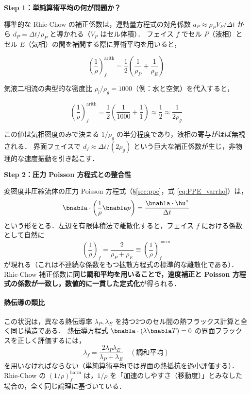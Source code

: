 \textbf{Step 1：単純算術平均の何が問題か？}

標準的な Rhie-Chow の補正係数は，運動量方程式の対角係数 $a_P \approx \rho_P V_P / \Delta t$ から $d_P = \Delta t / \rho_P$ と導かれる（$V_P$ はセル体積）．
フェイス $f$ でセル $P$（液相）とセル $E$（気相）の間を補間する際に算術平均を用いると，

\begin{equation}
 \left(\frac{1}{\rho}\right)^{\mathrm{arith}}_f = \frac{1}{2}\left(\frac{1}{\rho_P} + \frac{1}{\rho_E}\right)
\end{equation}

気液二相流の典型的な密度比 $\rho_l/\rho_g = 1000$（例：水と空気）を代入すると，

\begin{equation}
 \left(\frac{1}{\rho}\right)^{\mathrm{arith}}_f
 = \frac{1}{2}\!\left(\frac{1}{1000} + \frac{1}{1}\right)
 \approx \frac{1}{2} \approx \frac{1}{2\rho_g}
\end{equation}

この値は気相密度のみで決まる $1/\rho_g$ の半分程度であり，液相の寄与がほぼ無視される．
界面フェイスで $d_f \approx \Delta t / (2\rho_g)$ という巨大な補正係数が生じ，非物理的な速度振動を引き起こす．

\textbf{Step 2：圧力 Poisson 方程式との整合性}

変密度非圧縮流体の圧力 Poisson 方程式（§\ref{sec:ppe}，式 \eqref{eq:PPE_varrho}）は，
\begin{equation}
 \bnabla \cdot \left( \frac{1}{\rho} \bnabla p \right) = \frac{\bnabla \cdot \bu^*}{\Delta t}
\end{equation}
という形をとる．左辺を有限体積法で離散化すると，フェイス $f$ における係数として自然に
\begin{equation}
 \left(\frac{1}{\rho}\right)_f = \frac{2}{\rho_P + \rho_E} \equiv \left(\frac{1}{\rho}\right)^{\mathrm{harm}}_f
\end{equation}
が現れる（これは不連続な係数をもつ拡散方程式の標準的な離散化である）．
Rhie-Chow 補正係数に\textbf{同じ調和平均を用いることで，速度補正と Poisson 方程式の係数が一致し，数値的に一貫した定式化}が得られる．

\paragraph{熱伝導の類比}
この状況は，異なる熱伝導率 $\lambda_P, \lambda_E$ を持つ2つのセル間の熱フラックス計算と全く同じ構造である．
熱伝導方程式 $\bnabla \cdot (\lambda \bnabla T) = 0$ の界面フラックスを正しく評価するには，
\[ \lambda_f = \frac{2\lambda_P \lambda_E}{\lambda_P + \lambda_E} \quad (\text{調和平均}) \]
を用いなければならない（単純算術平均では界面の熱抵抗を過小評価する）．
Rhie-Chow の $(1/\rho)_f^\mathrm{harm}$ は，$1/\rho$ を「加速のしやすさ（移動度）」とみなした場合の，全く同じ論理に基づいている．

